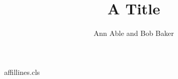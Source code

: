 \begin{filecontents*}[overwrite]{affillines.cls}
\def\affilfont{\small}
\def\affil#1{\par{\reset@font\affilfont#1\par}}
\def\inst#1{\textsuperscript{#1}}
\def\@maketitle{\newpage{\Large\bfseries\@title\par}\vskip1em\noindent{\bfseries\@author\par}\vskip1em}
\end{filecontents*}
\documentclass{affillines}

\title{A Title}
\author{Ann Able and Bob Baker}
\maketitle
Body.

